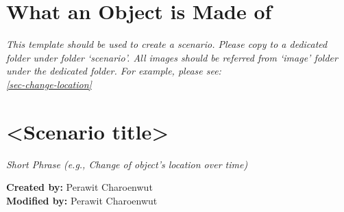 \section{What an Object is Made of}
\label{chapter-scenario-template}
\textit{This template should be used to create a scenario. Please copy to a dedicated folder under folder `scenario'. All images should be referred from `image' folder under the dedicated folder. For example, please see: \\
\cref{sec-change-location}}

\section*{<Scenario title>}

\textit{Short Phrase (e.g., Change of object's location over time)}

\textbf{Created by:} Perawit Charoenwut \\
\textbf{Modified by:} Perawit Charoenwut \\

